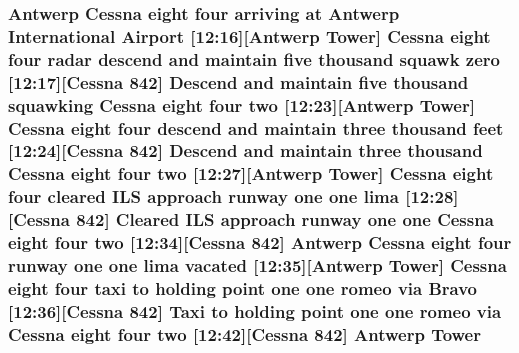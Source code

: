 \subsubsection[{\texorpdfstring{Tower}{Tower}}]{\setlength{\rightskip}{0pt plus 5cm}Antwerp {\bf Cessna} eight four arriving at Antwerp International {\bf Airport} \mbox{[}12\+:16\mbox{]}\mbox{[}Antwerp Tower\mbox{]} {\bf Cessna} eight four radar descend and maintain five {\bf thousand} squawk {\bf zero} \mbox{[}12\+:17\mbox{]}\mbox{[}{\bf Cessna} 842\mbox{]} Descend and maintain five {\bf thousand} {\bf squawking} {\bf Cessna} eight four {\bf two} \mbox{[}12\+:23\mbox{]}\mbox{[}Antwerp Tower\mbox{]} {\bf Cessna} eight four descend and maintain three {\bf thousand} {\bf feet} \mbox{[}12\+:24\mbox{]}\mbox{[}{\bf Cessna} 842\mbox{]} Descend and maintain three {\bf thousand} {\bf Cessna} eight four {\bf two} \mbox{[}12\+:27\mbox{]}\mbox{[}Antwerp Tower\mbox{]} {\bf Cessna} eight four cleared I\+LS approach runway {\bf one} {\bf one} {\bf lima} \mbox{[}12\+:28\mbox{]}\mbox{[}{\bf Cessna} 842\mbox{]} Cleared I\+LS approach runway {\bf one} {\bf one} {\bf Cessna} eight four {\bf two} \mbox{[}12\+:34\mbox{]}\mbox{[}{\bf Cessna} 842\mbox{]} Antwerp {\bf Cessna} eight four runway {\bf one} {\bf one} {\bf lima} vacated \mbox{[}12\+:35\mbox{]}\mbox{[}Antwerp Tower\mbox{]} {\bf Cessna} eight four taxi to holding point {\bf one} {\bf one} {\bf romeo} via {\bf Bravo} \mbox{[}12\+:36\mbox{]}\mbox{[}{\bf Cessna} 842\mbox{]} Taxi to holding point {\bf one} {\bf one} {\bf romeo} via {\bf Cessna} eight four {\bf two} \mbox{[}12\+:42\mbox{]}\mbox{[}{\bf Cessna} 842\mbox{]} Antwerp Tower}\hypertarget{happyDay2ATC_8txt_a53ba8c5e293ec8b769402961740bf7b2}{}\label{happyDay2ATC_8txt_a53ba8c5e293ec8b769402961740bf7b2}

